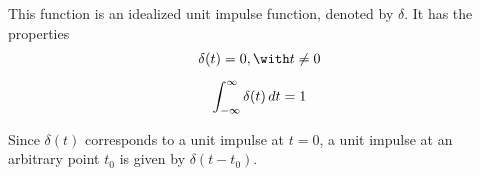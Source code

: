 \label{a2fd0bb}

This function is an idealized unit impulse function, denoted by $\delta$. It
has the properties
\begin{gather*}
  \delta(t)=0,\with t\neq0\\[0.5em]
  \int_{-\infty}^\infty\delta(t)\,dt=1
\end{gather*}

Since $\delta(t)$ corresponds to a unit impulse at $t=0$, a unit impulse at an
arbitrary point $t_0$ is given by $\delta(t-t_0)$.

%
%
%
%
%
%
%
%
%
%
